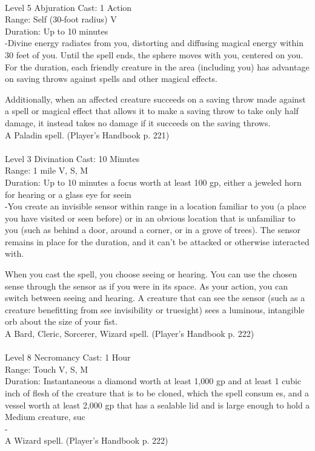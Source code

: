 \documentclass[10pt,twocolumn]{report}
\begin{document}
 \\
Level 5 \quad Abjuration \quad Cast: 1 Action\\
Range: Self (30-foot radius) \quad V\\
Duration: Up to 10 minutes \quad \\
-Divine energy radiates from you, distorting and diffusing magical energy within 30 feet of you. 
Until the spell ends, the sphere moves with you, centered on you. For the duration, each friendly creature in the area (including you) has advantage on saving throws against spells and other magical effects. 

Additionally, when an affected creature succeeds on a saving throw made against a spell or magical effect that allows it to make a saving throw to take only half damage, it instead takes no damage if it succeeds on the saving throws.\\
A Paladin spell. (Player's Handbook p. 221) \\


 \\
Level 3 \quad Divination \quad Cast: 10 Minutes\\
Range: 1 mile \quad V, S, M \\
Duration: Up to 10 minutes \quad a focus worth at least 100 gp, either a jeweled horn for hearing or a glass eye for seein\\
-You create an invisible sensor within range in a location familiar to you (a place you have visited or seen before) or in an obvious location that is unfamiliar to you (such as behind a door, around a corner, or in a grove of trees). The sensor remains in place for the duration, and it can’t be attacked or otherwise interacted with. 

When you cast the spell, you choose seeing or hearing. You can use the chosen sense through the sensor as if you were in its space. As your action, you can switch between seeing and hearing. A creature that can see the sensor (such as a creature benefitting from see invisibility or truesight) sees a luminous, intangible orb about the size of your fist.\\
A Bard, Cleric, Sorcerer, Wizard spell. (Player's Handbook p. 222) \\


 \\
Level 8 \quad Necromancy \quad Cast: 1 Hour\\
Range: Touch \quad V, S, M\\
Duration: Instantaneous \quad a diamond worth at least 1,000 gp and at least 1 cubic inch of flesh of the creature that is to be cloned, which the spell consum es, and a vessel worth at least 2,000 gp that has a sealable lid and is large enough to hold a Medium creature, suc\\
-\\
A Wizard spell. (Player's Handbook p. 222) \\
\end{document}
